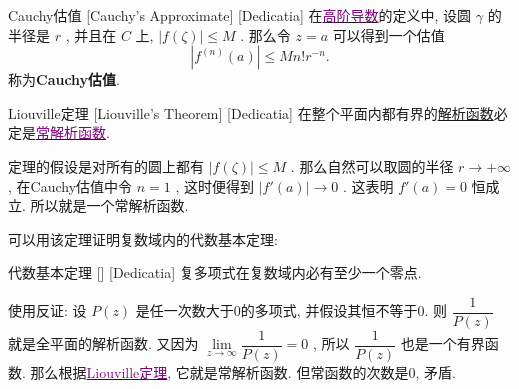 \documentclass[UTF8]{ctexart}
\newcommand{\hyperrefc}[2]{\hyperref[#1]{\textcolor{purple}{#2}}}
\newcommand{\AnalyticalFunction}{\hyperref[dfn:AnalyticalFunction]{解析函数}}
\begin{document}
\begin{dfn}
    [UUID]
    {Cauchy估值}
    [Cauchy's Approximate]
    [Dedicatia]
    在\hyperrefc{dfn:HighOrderedDerivative}{高阶导数}的定义中, 设圆 \( \gamma \) 的半径是 \( r \) , 并且在 \( C \) 上,  \( |f(\zeta)|\leqslant M \) . 那么令 \( z=a \) 可以得到一个估值
    \[|f^{(n)}(a)|\leqslant Mn!r^{-n}.\]
    称为\textbf{Cauchy估值}.
\end{dfn}
\begin{thm}
    [Liouville]
    {Liouville定理}
    [Liouville's Theorem]
    [Dedicatia]
    在整个平面内都有界的\AnalyticalFunction 必定是\hyperrefc{ppt:TrivialAnalyticalFunction}{常解析函数}. 
\end{thm}
\begin{prf}
    定理的假设是对所有的圆上都有 \( |f(\zeta)|\leqslant M \) . 那么自然可以取圆的半径 \( r\to+\infty  \) , 在Cauchy估值中令 \( n=1 \) , 这时便得到 \( |f'(a)|\to 0 \) . 这表明 \( f'(a)=0 \) 恒成立. 所以就是一个常解析函数. 
\end{prf}
可以用该定理证明复数域内的代数基本定理: 
\begin{thm}
    [UUID]
    {代数基本定理}
    []
    [Dedicatia]
    复多项式在复数域内必有至少一个零点. 
\end{thm}
\begin{prf}
    使用反证: 设 \( P(z) \) 是任一次数大于0的多项式, 并假设其恒不等于0. 则 \( \dfrac{1}{P(z)} \) 就是全平面的解析函数. 又因为 \( \lim\limits_{z\to\infty}\dfrac{1}{P(z)}=0 \) , 所以 \( \dfrac{1}{P(z)} \) 也是一个有界函数. 那么根据\hyperrefc{thm:Liouville}{Liouville定理}, 它就是常解析函数. 但常函数的次数是0, 矛盾. 
\end{prf}
\end{document}
